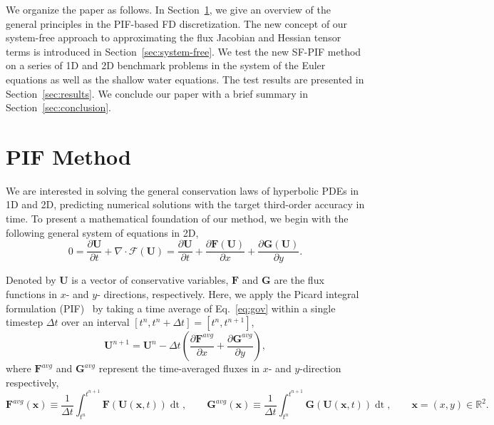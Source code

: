 \documentclass[times,preprint,3p]{elsarticle}
\newcommand{\pd}[2]{\frac{\partial #1}{\partial #2}}
\newcommand{\dt}{\Delta t}
\newcommand{\bF}{\mathbf{F}}
\newcommand{\bG}{\mathbf{G}}
\newcommand{\bU}{\mathbf{U}}
\newcommand{\bx}{\mathbf{x}}
\begin{document}
%
We organize the paper as follows. In Section~\ref{sec:finite-diff-meth}, we give an overview
of the general principles in the PIF-based FD discretization.
The new concept of our system-free approach to approximating
the flux Jacobian and Hessian tensor terms is introduced in Section~\ref{sec:system-free}.
We test the new SF-PIF method on a series of 1D and 2D benchmark problems
in the system of the Euler equations as well as the shallow water equations.
The test results are presented in Section~\ref{sec:results}.
We conclude our paper with a brief summary in Section~\ref{sec:conclusion}.



\section{PIF Method}\label{sec:finite-diff-meth}
We are interested in solving the general conservation laws of hyperbolic PDEs
in 1D and 2D, predicting numerical solutions with the target third-order accuracy in time.
To present a mathematical foundation of our method, we begin with
the following general system of equations in 2D,
\begin{equation}\label{eq:gov}
    0= \pd{\bU}{t} + \nabla \cdot \mathcal{F}(\bU) = \pd{\bU}{t} + \pd{\bF(\bU)}{x} + \pd{\bG(\bU)}{y}.
\end{equation}

Denoted by \( \bU \) is a vector of conservative variables, \( \bF \) and \( \bG \)
are the flux functions in $x$- and $y$- directions, respectively.
Here, we apply the Picard integral formulation (PIF)~\cite{christlieb2015picard}
by taking a time average of Eq.~\eqref{eq:gov} within a single timestep \( \dt \) over an interval
$[t^n, t^n+\dt] = [t^n, t^{n+1}]$,
\begin{equation}\label{eq:pif}
    \bU^{n + 1} = \bU^{n} - \dt \left( \pd{\bF^{avg}}{x} + \pd{\bG^{avg}}{y} \right),
\end{equation}
where \( \bF^{avg} \) and \( \bG^{avg} \) represent the time-averaged fluxes
in \( x \)- and \( y \)-direction respectively,
\begin{equation}\label{eq:avg-flx}
    \bF^{avg} (\bx) \equiv \frac{1}{\dt} \int^{t^{n + 1}}_{t^{n}} \bF(\bU(\bx, t)) \mathop{dt}, \quad\quad
    \bG^{avg} (\bx) \equiv \frac{1}{\dt} \int^{t^{n + 1}}_{t^{n}} \bG(\bU (\bx, t)) \mathop{dt}, \quad\quad
    \bx = (x, y) \in \mathbb{R}^2.
\end{equation}
\end{document}
